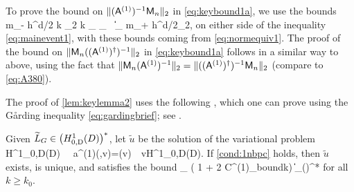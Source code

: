 To prove the bound on  $\|(\mathsf{A}^{(1)})^{-1}\mathsf{M}_n\|_{2}$ in \cref{eq:keybound1a}, we use the bounds 
\beqs
m_- h^{d/2} k \N{\tbu}_2 \leq k _{\LtD} \leq {}_{\HokD}
\,\tand\,
\big\|\big\|_{\LtD} \leq m_+ h^{d/2}\N{\fvec}_2,
\eeqs
on either side of the inequality \cref{eq:mainevent1}, with these bounds coming from \cref{eq:normequiv1}. The proof of the bound on 
$\|\mathsf{M}_n((\mathsf{A}^{(1)})^\dagger)^{-1}\|_{2}$ in \cref{eq:keybound1a} follows in a similar way to above, using the fact that 
$\|\mathsf{M}_n (\mathsf{A}^{(1)})^{-1}\|_2=\|((\mathsf{A}^{(1)})^\dagger)^{-1}\mathsf{M}_n\|_2$ (compare to \cref{eq:A380}).
%
%
\epf

The proof of \cref{lem:keylemma2} uses the following , which one can prove using the G\aa rding inequality \cref{eq:gardingbrief}; see \cite[Lemma 5.1]{GrPeSp:19}.

\label{lem:H1}
Given $\LGtilde\in \HozDDs$, let $\widetilde{u}$ be the solution of the variational problem
\beqs
{} \,\, \in H^1_{0,D}(D) \,\,\tst \,\,
a^{(1)}(,v)=\LGtilde(v) \,\, \tfa v\in H^1_{0,D}(D).
\eeqs
If \cref{cond:1nbpc} holds, then $\widetilde{u}$ exists, is unique, and satisfies the bound
\beq\label{eq:bound2}
_{\HokD} \leq {}\left( 1 + 2 C^{(1)}_{\rm bound}\nsomax  k\right) \big\|\LGtilde\big\|_{(\HokD)^*}
\eeq
for all $k\geq k_0$.
\ele


